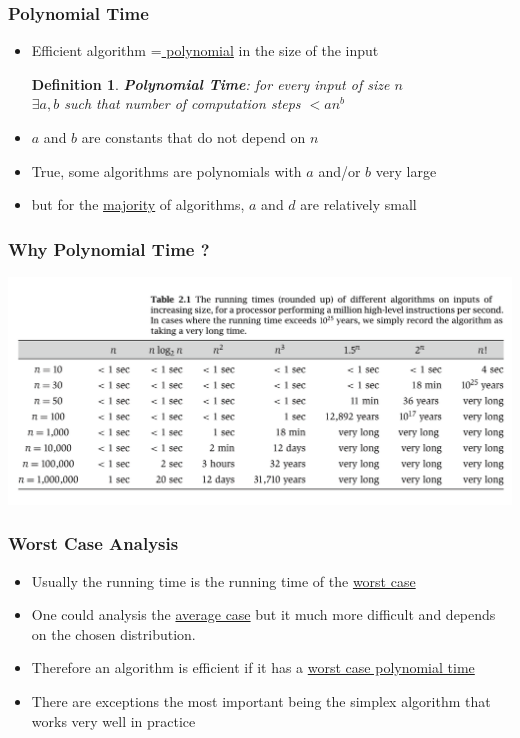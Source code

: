 \documentclass{beamer}
\newtheorem{mydef}{Definition}
\newcommand{\emphasis}[1]{\ul{#1}}
\begin{document}
\begin{frame}
\frametitle{Polynomial Time}
\begin{itemize}
\item Efficient algorithm =\emphasis{ polynomial} in the size of the input
     \begin{mydef}
       \textbf{Polynomial Time}: for every input of size $n$\\
 $\exists a,b$ such
   that number of computation steps $<an^b$
     \end{mydef}
\item $a$ and $b$ are constants that do not depend on $n$
  \item True, some algorithms are polynomials with $a$ and/or $b$ very large
\item but for the \emphasis{majority} of algorithms, $a$ and $d$ are
  relatively small

\end{itemize}
\end{frame}
\begin{frame}
\frametitle{Why Polynomial Time ?}
  \begin{center}
  \includegraphics[width=\textwidth]{complexity-figs/growth-table.pdf}    
  \end{center}

\end{frame}

\begin{frame}
\frametitle{Worst Case Analysis}
\begin{itemize}
\item Usually the running time is the running time of the
  \emphasis{worst case}
\item One could analysis the \emphasis{average case} but it much more
  difficult and depends on the chosen distribution.
\item Therefore an algorithm is efficient if it has a \emphasis{worst case
  polynomial time}
\item There are exceptions the most important being the simplex
  algorithm that works very well in practice
\end{itemize}
\end{frame}
\end{document}
